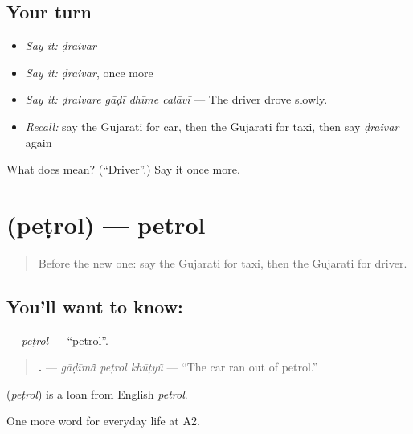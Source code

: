\subsection*{Your turn}
\begin{itemize}
\raggedright
  \item \emph{Say it:} \emph{ḍraivar}
  \item \emph{Say it:} \emph{ḍraivar}, once more
  \item \emph{Say it:} \emph{ḍraivare gāḍī dhīme calāvī} — The driver drove slowly.
  \item \emph{Recall:} say the Gujarati for car, then the Gujarati for taxi, then say \emph{ḍraivar} again
\end{itemize}

\begin{tcolorbox}[breakable,colback=teal!4,colframe=teal!35!black,title={Before you move on}]
What does  mean? (\textquotedblleft{}Driver\textquotedblright{}.) Say it once more.
\end{tcolorbox}
\section[\texorpdfstring{\gu{પેટ્રોલ} (peṭrol)}{પેટ્રોલ (peṭrol)}]{ (peṭrol) — petrol}

\label{lesson:GU-C207-petrol}



\begin{quote}
Before the new one: say the Gujarati for taxi, then the Gujarati for driver.
\end{quote}

\subsection*{You'll want to know: }
\textbf{} — \emph{peṭrol} — \textquotedblleft{}petrol\textquotedblright{}.

\begin{quote}
\textbf{  .} — \emph{gāḍīmā̃ peṭrol khūṭyũ} — \textquotedblleft{}The car ran out of petrol.\textquotedblright{}
\end{quote}

\begin{cousinweb}
\textbf{} (\emph{peṭrol}) is a loan from English \emph{petrol}.
\end{cousinweb}

\begin{grammarlens}[title={What you've built}]
One more word for everyday life at A2.
\end{grammarlens}

